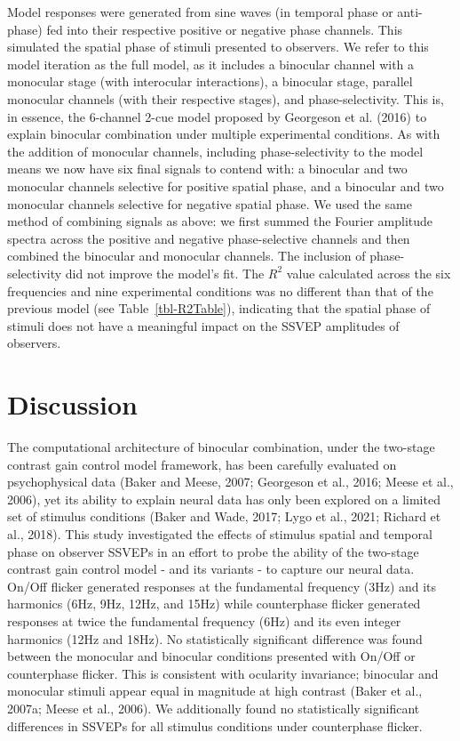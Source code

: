\documentclass[review,
  12pt,
]{elsarticle}
\begin{document}
Model responses were generated from sine waves (in temporal phase or
anti-phase) fed into their respective positive or negative phase
channels. This simulated the spatial phase of stimuli presented to
observers. We refer to this model iteration as the full model, as it
includes a binocular channel with a monocular stage (with interocular
interactions), a binocular stage, parallel monocular channels (with
their respective stages), and phase-selectivity. This is, in essence,
the 6-channel 2-cue model proposed by Georgeson et al. (2016) to explain
binocular combination under multiple experimental conditions. As with
the addition of monocular channels, including phase-selectivity to the
model means we now have six final signals to contend with: a binocular
and two monocular channels selective for positive spatial phase, and a
binocular and two monocular channels selective for negative spatial
phase. We used the same method of combining signals as above: we first
summed the Fourier amplitude spectra across the positive and negative
phase-selective channels and then combined the binocular and monocular
channels. The inclusion of phase-selectivity did not improve the model's
fit. The \(R^2\) value calculated across the six frequencies and nine
experimental conditions was no different than that of the previous model
(see Table~\ref{tbl-R2Table}), indicating that the spatial phase of
stimuli does not have a meaningful impact on the SSVEP amplitudes of
observers.

\section{Discussion}\label{discussion}

The computational architecture of binocular combination, under the
two-stage contrast gain control model framework, has been carefully
evaluated on psychophysical data (Baker and Meese, 2007; Georgeson et
al., 2016; Meese et al., 2006), yet its ability to explain neural data
has only been explored on a limited set of stimulus conditions (Baker
and Wade, 2017; Lygo et al., 2021; Richard et al., 2018). This study
investigated the effects of stimulus spatial and temporal phase on
observer SSVEPs in an effort to probe the ability of the two-stage
contrast gain control model - and its variants - to capture our neural
data. On/Off flicker generated responses at the fundamental frequency
(3Hz) and its harmonics (6Hz, 9Hz, 12Hz, and 15Hz) while counterphase
flicker generated responses at twice the fundamental frequency (6Hz) and
its even integer harmonics (12Hz and 18Hz). No statistically significant
difference was found between the monocular and binocular conditions
presented with On/Off or counterphase flicker. This is consistent with
ocularity invariance; binocular and monocular stimuli appear equal in
magnitude at high contrast (Baker et al., 2007a; Meese et al., 2006). We
additionally found no statistically significant differences in SSVEPs
for all stimulus conditions under counterphase flicker.
\end{document}
